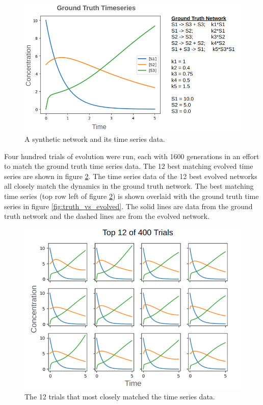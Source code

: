 \documentclass[12pt]{report}
\begin{document}
\begin{figure}
\centering
    \includegraphics[width=18cm]{images/groundtruth.png}
    \caption[A ground truth synthetic network and its time series]{A synthetic network and its time series data.}
    \label{fig:groundtruth}
\end{figure}

Four hundred trials of evolution were run, each with 1600 generations in an effort to match the ground truth time series data. The 12 best matching evolved time series are shown in figure \ref{fig:12_timeseries}. The time series data of the 12 best evolved networks all closely match the dynamics in the ground truth network. The best matching time series (top row left of figure \ref{fig:12_timeseries}) is shown overlaid with the ground truth time series in figure \ref{fig:truth_vs_evolved}. The solid lines are data from the ground truth network and the dashed lines are from the evolved network.

\begin{figure}
\centering
    \includegraphics[width=15cm]{images/12_timeseries.png}
    \caption[The 12 trials that most closely matched the time series data]{The 12 trials that most closely matched the time series data.}
    \label{fig:12_timeseries}
\end{figure}
\end{document}
